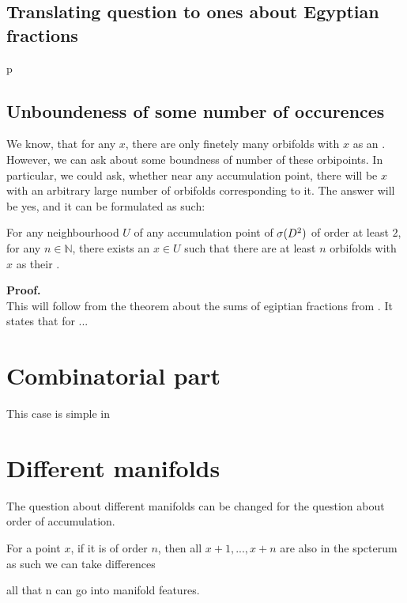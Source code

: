 \subsection{Translating question to ones about Egyptian fractions}\label{Egyptian_fractions}
p
\subsection{Unboundeness of some number of occurences}
We know, that for any $x$, there are only finetely many orbifolds with $x$ as an \Eoc . 
However, we can ask about some boundness of number of these orbipoints. 
In particular, we could ask, whether near any accumulation point, there will be $x$ with an 
arbitrary large number of orbifolds corresponding to it. 
The answer will be yes, and it can be formulated as such:
\begin{theorem}
For any neighbourhood $U$ of any accumulation point of ${{\sigma}(D^2)}$ of order at least $2$, for any 
$n\in \mathbb{N}$, 
there exists an $x\in U$ such that there are at least $n$ orbifolds with $x$ as their 
\Eoc.
\end{theorem}
\textbf{Proof.}\\
This will follow from the theorem about the sums of egiptian fractions from \cite{Browning2011}.
It states that for ...




\section{Combinatorial part}\label{counting_combinatorics}
This case is simple in 

\section{Different manifolds}\label{conting_diff_man}
The question about different manifolds can be changed for the question about order of 
accumulation. 

For a point $x$, if it is of order $n$, then all $x+1,...,x+n$ are also in the spcterum
as such we can take differences

all that n can go into manifold features.
 












